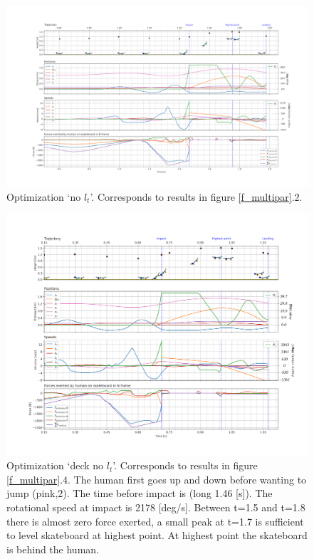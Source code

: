 \begin{figure}[t]
    \centering
    \includegraphics[trim={0cm 0cm 0cm 0cm},clip,width=\textwidth]{figure/Results/data_no_taildpi600.png}
    \caption[Trajectory, positions, speeds, and forces for `all except tail length' optimization]{Optimization `no $l_t$'. Corresponds to results in figure \ref{f_multipar}.2.}
    \label{f_notail}
\end{figure}
\begin{figure}[t]
    \centering
    \includegraphics[trim={0cm 0cm 0cm 0cm},clip,width=\textwidth]{figure/Results/data_notrrwltdpi600.png}
    \vspace{-0.5cm}\caption[Trajectory, positions, speeds, and forces for `deck except tail length' optimization]{Optimization `deck no $l_t$'. Corresponds to results in figure \ref{f_multipar}.4. The human first goes up and down before wanting to jump (pink,2). The time before impact is (long 1.46 [s]). The rotational speed at impact is 2178 [deg/s]. Between t=1.5 and t=1.8 there is almost zero force exerted, a small peak at t=1.7 is sufficient to level skateboard at highest point. At highest point the skateboard is behind the human. }
    \label{f_notailnotruck}
\end{figure}

